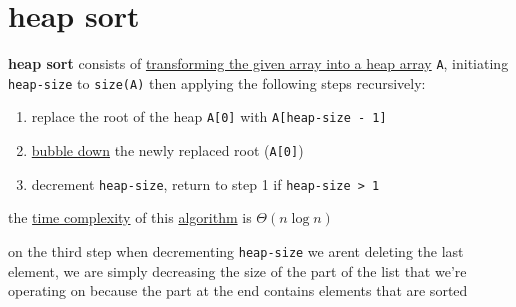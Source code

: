 \documentclass[a4paper,12pt]{article}
\begin{document}
\section{heap sort}
\label{sec:orga9b27a9}
\textbf{heap sort} consists of \href{data_structures.org}{transforming the given array into a heap array} \texttt{A}, initiating \texttt{heap-size} to \texttt{size(A)} then applying the following steps recursively:\\
\begin{enumerate}
\item replace the root of the heap \texttt{A[0]} with \texttt{A[heap-size - 1]}\\
\item \href{data_structures.org}{bubble down} the newly replaced root (\texttt{A[0]})\\
\item decrement \texttt{heap-size}, return to step 1 if \texttt{heap-size > 1}\\
\end{enumerate}
\begin{lemma}
the \href{20221130014441-time_complexity.org}{time complexity} of this \href{20220706211958-algorithm.org}{algorithm} is \(\Theta(n\log n)\)\\
\end{lemma}
\begin{note}
on the third step when decrementing \texttt{heap-size} we arent deleting the last element, we are simply decreasing the size of the part of the list that we're operating on because the part at the end contains elements that are sorted\\
\end{note}
\end{document}
